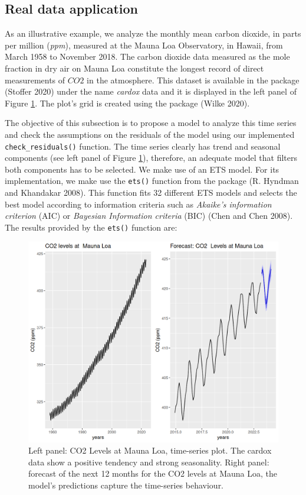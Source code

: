 \hypertarget{real-data-application}{%
\subsection{Real data application}\label{real-data-application}}

As an illustrative example, we analyze the monthly mean carbon dioxide, in parts per million (\emph{ppm}), measured at the Mauna Loa Observatory, in Hawaii, from March 1958 to November 2018. The carbon dioxide data measured as the mole fraction in dry air on Mauna Loa constitute the longest record of direct measurements of \(CO2\) in the atmosphere. This dataset is available in the  package (Stoffer 2020) under the name \emph{cardox} data and it is displayed in the left panel of Figure \ref{fig:fig1-static}. The plot's grid is created using the  package (Wilke 2020).

The objective of this subsection is to propose a model to analyze this time series and check the assumptions on the residuals of the model using our implemented \texttt{check\_residuals()} function. The time series clearly has trend and seasonal components (see left panel of Figure \ref{fig:fig1-static}), therefore, an adequate model that filters both components has to be selected. We make use of an ETS model. For its implementation, we make use the \texttt{ets()} function from the  package (R. Hyndman and Khandakar 2008). This function fits 32 different ETS models and selects the best model according to information criteria such as \emph{Akaike's information criterion} (AIC) or \emph{Bayesian Information criteria} (BIC) (Chen and Chen 2008).
The results provided by the \texttt{ets()} function are:

\begin{figure}

{\centering \includegraphics[width=0.75\linewidth]{figures/fig1-static-1} 

}

\caption{Left panel: CO2 Levels at Mauna Loa, time-series plot. The cardox data show a positive tendency and strong seasonality. Right panel: forecast of the next 12 months for the CO2 levels at Mauna Loa, the model's predictions capture the time-series behaviour.}\label{fig:fig1-static}
\end{figure}



